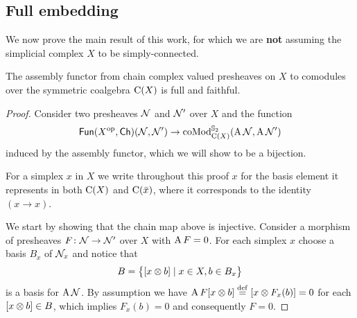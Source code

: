 
\subsection{Full embedding}\label{ss:full embedding}

We now prove the main result of this work, for which we are \textbf{not} assuming the simplicial complex $X$ to be simply-connected.

\begin{theorem*}
	The assembly functor from chain complex valued presheaves on $X$ to comodules over the symmetric coalgebra $\chains(X)$ is full and faithful.
\end{theorem*}

\begin{proof}
	Consider two presheaves $\cN$ and $\cN'$ over $X$ and the function
	\[
	\Fun(X^\op, \Ch)(\cN, \cN') \to \coMod^{\Sym_2}_{\chains(X)}(\assembly \cN, \assembly \cN')
	\]
	induced by the assembly functor, which we will show to be a bijection.

	For a simplex $x$ in $X$ we write throughout this proof $x$ for the basis element it represents in both $\chains(X)$ and $\chains(\bar x)$, where it corresponds to the identity $(x \to x)$.

	We start by showing that the chain map above is injective.
	Consider a morphism of presheaves $F \colon \cN \to \cN'$ over $X$ with $\assembly F = 0$.
	For each simplex $x$ choose a basis $B_x$ of $\cN_x$ and notice that
	\[
	B = \set[\big]{[x \ot b] \mid x \in X, b \in B_x}
	\]
	is a basis for $\assembly \cN$.
	By assumption we have $\assembly F [x \ot b] \defeq [x \ot F_x(b)] = 0$ for each $[x \ot b] \in B$, which implies $F_x(b) = 0$ and consequently $F = 0$.


\end{proof}
